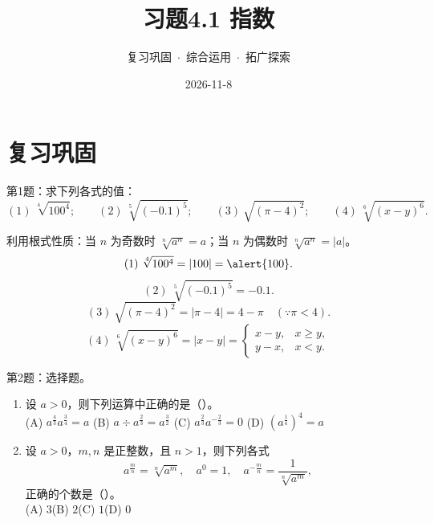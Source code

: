 \documentclass[10pt,aspectratio=169,serif,fleqn]{beamer}
\title[习题4.1]{习题4.1 指数}
\subtitle{复习巩固 \,$\cdot$\, 综合运用 \,$\cdot$\, 拓广探索}
\author{}
\institute{}
\date{2026-11-8}
\begin{document}
\begin{frame}
  \titlepage
\end{frame}

\section{复习巩固}
\begin{frame}[t]{第1题：求下列各式的值：}\vspace{-2em}
\[
(1)\ \sqrt[4]{100^{4}};\qquad
(2)\ \sqrt[5]{(-0.1)^{5}};\qquad
(3)\ \sqrt{(\pi-4)^{2}};\qquad
(4)\ \sqrt[6]{(x-y)^{6}}.
\]

\begin{tcolorbox}[colback=orange!10,colframe=orange,title=\textbf{解}]
	利用根式性质：当 $n$ 为奇数时 $\sqrt[n]{a^{n}}=a$；当 $n$ 为偶数时 $\sqrt[n]{a^{n}}=|a|$。
	\[
	(1)\ \sqrt[4]{100^{4}} = |100| = \alert{100}.
	\]
	\[
	(2)\ \sqrt[5]{(-0.1)^{5}} = -0.1.
	\]
	\[
	(3)\ \sqrt{(\pi-4)^{2}} = |\pi-4| = 4-\pi \quad(\because \pi<4).
	\]
	\[
	(4)\ \sqrt[6]{(x-y)^{6}} = |x-y| =
	\begin{cases}
		x-y, & x\ge y,\\
		y-x, & x<y.
	\end{cases}
	\]
\end{tcolorbox}
\end{frame}



\begin{frame}[t]{第2题：选择题。}

\begin{enumerate}
	\item 设 $a>0$，则下列运算中正确的是（\quad）。\\[5pt]
	
	(A) $a^{\frac{4}{3}}a^{\frac{3}{4}}=a$\qquad
	(B) $a\div a^{\frac{2}{3}}=a^{\frac{3}{2}}$\qquad
	(C) $a^{\frac{2}{3}}a^{-\frac{2}{3}}=0$\qquad
	(D) $(a^{\frac{1}{4}})^{4}=a$\\[10pt]
	\item 设 $a>0$，$m,n$ 是正整数，且 $n>1$，则下列各式
	\[
	a^{\frac{m}{n}}=\sqrt[n]{a^{m}},\quad a^{0}=1,\quad a^{-\frac{m}{n}}=\frac{1}{\sqrt[n]{a^{m}}},
	\]
	正确的个数是（\quad）。\\[5pt]
	
	(A) $3$\qquad (B) $2$\qquad (C) $1$\qquad (D) $0$
\end{enumerate}

\end{frame}
\end{document}
